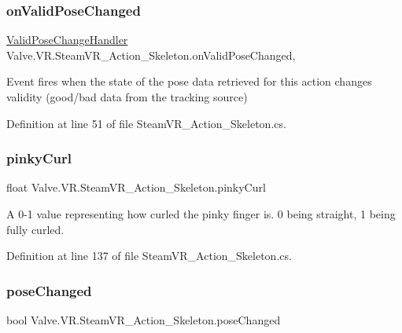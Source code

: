 \subsubsection{\texorpdfstring{onValidPoseChanged}{onValidPoseChanged}}
{\footnotesize\ttfamily \mbox{\hyperlink{class_valve_1_1_v_r_1_1_steam_v_r___action___skeleton_af5ad5e815b7f555aa33ee8b74385e89e}{Valid\+Pose\+Change\+Handler}} Valve.\+V\+R.\+Steam\+V\+R\+\_\+\+Action\+\_\+\+Skeleton.\+on\+Valid\+Pose\+Changed\hspace{0.3cm}{\ttfamily [add]}, {\ttfamily [remove]}}



Event fires when the state of the pose data retrieved for this action changes validity (good/bad data from the tracking source) 



Definition at line 51 of file Steam\+V\+R\+\_\+\+Action\+\_\+\+Skeleton.\+cs.

\mbox{\label{class_valve_1_1_v_r_1_1_steam_v_r___action___skeleton_a3702b47217fb09774c2404a76194cefe}} 
\subsubsection{\texorpdfstring{pinkyCurl}{pinkyCurl}}
{\footnotesize\ttfamily float Valve.\+V\+R.\+Steam\+V\+R\+\_\+\+Action\+\_\+\+Skeleton.\+pinky\+Curl\hspace{0.3cm}{\ttfamily [get]}}



A 0-\/1 value representing how curled the pinky finger is. 0 being straight, 1 being fully curled. 



Definition at line 137 of file Steam\+V\+R\+\_\+\+Action\+\_\+\+Skeleton.\+cs.

\mbox{\label{class_valve_1_1_v_r_1_1_steam_v_r___action___skeleton_a2d53125db8f4a6a5e35a4ec80c9ef445}} 
\subsubsection{\texorpdfstring{poseChanged}{poseChanged}}
{\footnotesize\ttfamily bool Valve.\+V\+R.\+Steam\+V\+R\+\_\+\+Action\+\_\+\+Skeleton.\+pose\+Changed\hspace{0.3cm}{\ttfamily [get]}}



